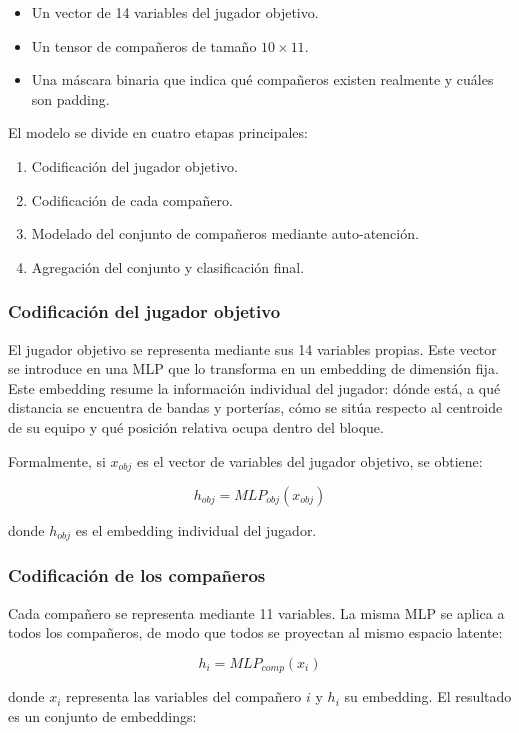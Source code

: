 \begin{itemize}
    \item Un vector de 14 variables del jugador objetivo.
    \item Un tensor de compañeros de tamaño $10 \times 11$.
    \item Una máscara binaria que indica qué compañeros existen realmente y cuáles son padding.
\end{itemize}

El modelo se divide en cuatro etapas principales:

\begin{enumerate}
    \item Codificación del jugador objetivo.
    \item Codificación de cada compañero.
    \item Modelado del conjunto de compañeros mediante auto-atención.
    \item Agregación del conjunto y clasificación final.
\end{enumerate}

\subsubsection{Codificación del jugador objetivo}

El jugador objetivo se representa mediante sus 14 variables propias. Este vector se introduce en una MLP que lo transforma en un embedding de dimensión fija. Este embedding resume la información individual del jugador: dónde está, a qué distancia se encuentra de bandas y porterías, cómo se sitúa respecto al centroide de su equipo y qué posición relativa ocupa dentro del bloque.

Formalmente, si $x_{obj}$ es el vector de variables del jugador objetivo, se obtiene:

\[
h_{obj} = MLP_{obj}(x_{obj})
\]

donde $h_{obj}$ es el embedding individual del jugador.

\subsubsection{Codificación de los compañeros}

Cada compañero se representa mediante 11 variables. La misma MLP se aplica a todos los compañeros, de modo que todos se proyectan al mismo espacio latente:

\[
h_i = MLP_{comp}(x_i)
\]

donde $x_i$ representa las variables del compañero $i$ y $h_i$ su embedding. El resultado es un conjunto de embeddings:

